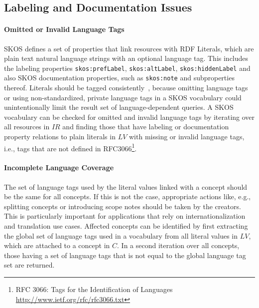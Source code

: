 

\subsection{Labeling and Documentation Issues}

\paragraph{Omitted or Invalid Language Tags}

SKOS defines a set of properties that link resources with RDF Literals, which are plain text natural language strings with an optional language tag. This includes the labeling properties \texttt{skos:prefLabel}, \texttt{skos:altLabel}, \texttt{skos:hiddenLabel} and also SKOS documentation properties, such as \texttt{skos:note} and subproperties thereof. Literals should be tagged consistently~\cite{Vrandecic2010}, because omitting language tags or using non-standardized, private language tags in a SKOS vocabulary could unintentionally limit the result set of language-dependent queries.
A SKOS vocabulary can be checked for omitted and invalid language tags by iterating over all resources in $IR$ and finding those that have labeling or documentation property relations to plain literals in $LV$ with missing or invalid language tags, i.e., tags that are not defined in RFC3066\footnote{RFC 3066: Tags for the Identification of Languages \url{http://www.ietf.org/rfc/rfc3066.txt}}.

\paragraph{Incomplete Language Coverage}

The set of language tags used by the literal values linked with a concept should be the same for all concepts. If this is not the case, appropriate actions like, e.g., splitting concepts or introducing scope notes should be taken by the creators. This is particularly important for applications that rely on internationalization and translation use cases.
Affected concepts can be identified by first extracting the global set of language tags used in a vocabulary from all literal values in $LV$, which are attached to a concept in $C$. In a second iteration over all concepts, those having a set of language tags that is not equal to the global language tag set are returned.

